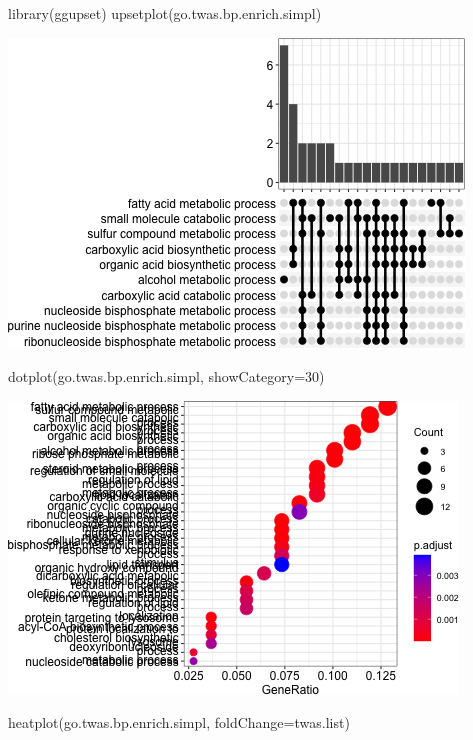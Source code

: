 \documentclass[
]{article}
\newenvironment{Shaded}{\begin{snugshade}}{\end{snugshade}}
\newcommand{\AttributeTok}[1]{\textcolor[rgb]{0.77,0.63,0.00}{#1}}
\newcommand{\DecValTok}[1]{\textcolor[rgb]{0.00,0.00,0.81}{#1}}
\newcommand{\FunctionTok}[1]{\textcolor[rgb]{0.00,0.00,0.00}{#1}}
\newcommand{\NormalTok}[1]{#1}
\begin{document}
\begin{Shaded}
\begin{Highlighting}[]
\FunctionTok{library}\NormalTok{(ggupset)}
\FunctionTok{upsetplot}\NormalTok{(go.twas.bp.enrich.simpl)}
\end{Highlighting}
\end{Shaded}

\includegraphics{figures/twas-go-ncd-6.png}

\begin{Shaded}
\begin{Highlighting}[]
\FunctionTok{dotplot}\NormalTok{(go.twas.bp.enrich.simpl, }\AttributeTok{showCategory=}\DecValTok{30}\NormalTok{)}
\end{Highlighting}
\end{Shaded}

\includegraphics{figures/twas-go-ncd-7.png}

\begin{Shaded}
\begin{Highlighting}[]
\FunctionTok{heatplot}\NormalTok{(go.twas.bp.enrich.simpl, }\AttributeTok{foldChange=}\NormalTok{twas.list)}
\end{Highlighting}
\end{Shaded}
\end{document}
